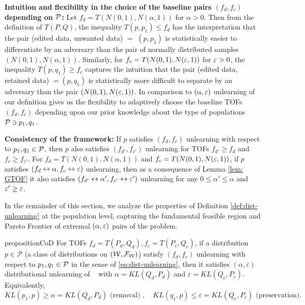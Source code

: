 \textbf{Intuition and flexibility in the choice of the baseline pairs $(f_d,f_c)$ depending on $\mathcal{P}$:}  Let $f_d= T(N(0,1), N(\alpha, 1))$ for $\alpha >0$. Then from the definition of $T(P,Q)$, the inequality  $T(p, p_1) \leq f_d$ has the interpretation that the pair (edited data, unwanted data) $=$ $(p, p_1)$ is statistically easier to differentiate by an adversary than the pair of normally distributed samples $(N(0,1), N(\alpha, 1))$. Similarly, for $f_c= T(N(0,1), N(\varepsilon, 1))$ for $\varepsilon>0$, the inequality  $T(p, q_1)\geq f_c$ captures the intuition that the pair (edited data, retained data) $= (p,q_1)$ is statistically more difficult to separate by an adversary than the pair $(N(0,1), N(\varepsilon, 1))$. In comparison to $(\alpha, \varepsilon)$ unlearning of \cite{allouah2025distributionalmachineunlearningselective} our definition gives us the flexibility to adaptively choose the baseline TOFs $(f_d,f_c)$ depending upon our prior knowledge about the type of populations $\mathcal{P} \ni  p_1, q_1 $.

\vspace{-1mm}

\textbf{Consistency of the framework: }  If $p$ satisfies $(f_d,f_c)$ unlearning with respect to $p_1,q_1\in \mathcal{P}$, then $p$ also satisfies $(f_{d'},f_{c'})$ unlearning for TOFs $f_{d'} \geq f_d$ and $f_c \geq f_{c'}$. For $f_d=T(N(0,1), N(\alpha, 1))$ and  $f_c=T(N(0,1), N(\varepsilon, 1))$, if $p$ satisfies $(f_d \leftrightarrow \alpha ,f_c \leftrightarrow \varepsilon)$ unlearning, then as a consequence of Lemma \ref{lem: GTOF} it also satisfies  $(f_{d'} \leftrightarrow \alpha' ,f_{c'} \leftrightarrow \varepsilon')$ unlearning for any $0\leq \alpha' \leq \alpha$ and $\varepsilon' \geq \varepsilon$.

In the remainder of this section, we analyze the properties of Definition \ref{def:dist-unlearning}  at the population level, capturing the fundamental feasible region and Pareto Frontier of extremal $(\alpha, \varepsilon)$ pairs of the problem. 

\begin{restatable}{proposition}{CoD}
\label{thm:CoD}
For TOFs $f_d =T(P_d, Q_d),f_c= T(P_c, Q_c) $, if  a distribution $p \in \mathcal{P}$ (a class of distributions on $(\mathcal{W}, \mathcal{F}_{\mathcal{W}})$) satisfy $(f_d,f_c)$ unlearning with respect to $p_1, q_1 \in \mathcal{P}$ in the sense of \eqref{eq:dist-unlearning}, then it satisfies $(\alpha, \varepsilon)$ distributional unlearning of ~\citet{allouah2025distributionalmachineunlearningselective} with $\alpha = KL(Q_d, P_d)$ and $\varepsilon= KL(Q_c,P_c)$. Equivalently,
\vspace{-1 mm}
\begin{equation} \label{eq:aeu}
KL(p_1, p) \geq \alpha =KL(Q_d,P_d) \text{ (removal) },
\quad 
KL(q_1, p) \leq \varepsilon= KL(Q_c, P_c) \text{ (preservation)}.
\end{equation}
\end{restatable}
\vspace{-4 mm}
